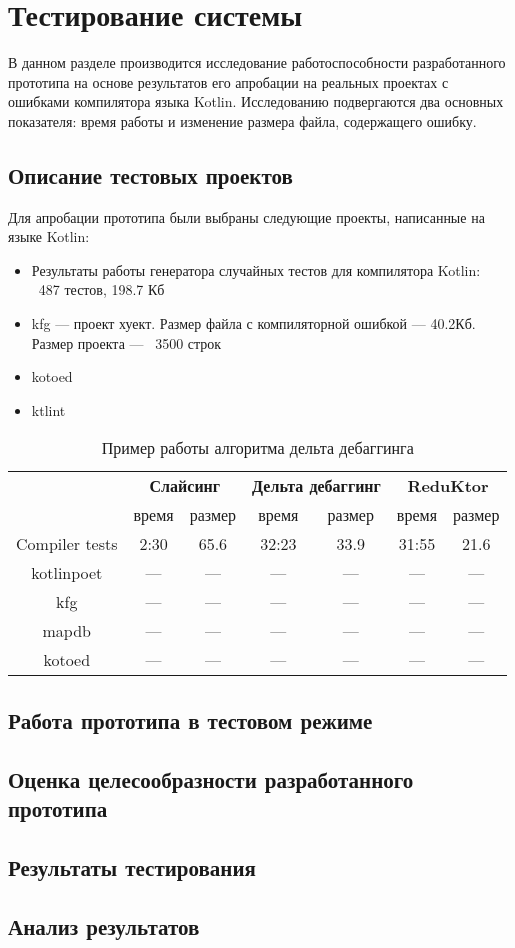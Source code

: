 \chapter{Тестирование системы}

В данном разделе производится исследование работоспособности разработанного прототипа на основе результатов его апробации на реальных проектах с ошибками компилятора языка Kotlin. Исследованию подвергаются два основных показателя: время работы и изменение размера файла, содержащего ошибку.
\section{Описание тестовых проектов}
Для апробации прототипа были выбраны следующие проекты, написанные на языке Kotlin:
\begin{itemize}
\item Результаты работы генератора случайных тестов для компилятора Kotlin: ~487 тестов, 198.7 Кб
\item kfg --- проект хуект. Размер файла с компиляторной ошибкой --- 40.2Кб. Размер проекта --- ~3500 строк  
\item kotoed
\item ktlint
\end{itemize}





\begin{table}[]
\center
\caption{\label{tab:ddminex2}Пример работы алгоритма дельта дебаггинга}
\begin{tabular}{| c | c | c | c | c | c | c |}
\hline
\bf \multirow{2}{*}{Проект} & \multicolumn{2}{|c|}{\bf Слайсинг} & \multicolumn{2}{|c|}{\bf Дельта дебаггинг}  & \multicolumn{2}{|c|}{\bf ReduKtor} \\
\cline{2-7}
& время & размер & время & размер & время & размер \\
\hline
Compiler tests & 2:30 & 65.6 & 32:23 & 33.9 & 31:55 & 21.6 \\
\hline
kotlinpoet & --- & --- & --- & --- & --- & --- \\
\hline
kfg & --- & --- & --- & --- & --- & --- \\
\hline
mapdb & --- & --- & --- & --- & --- & --- \\
\hline
kotoed & --- & --- & --- & --- & --- & --- \\
\hline
\end{tabular}
\end{table}

\section{Работа прототипа в тестовом режиме}
\section{Оценка целесообразности разработанного прототипа}
\section{Результаты тестирования}
\section{Анализ результатов}